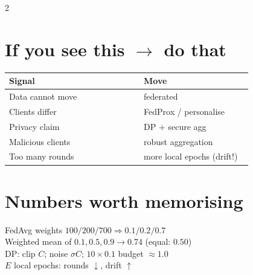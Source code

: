 \documentclass[11pt,a4paper]{article}
\newcommand{\sect}[1]{\section*{#1}}
\begin{document}
\begin{multicols}{2}
\sect{If you see this $\rightarrow$ do that}
\begin{tabular}{@{}p{0.52\linewidth}p{0.42\linewidth}@{}}
\toprule
Signal & Move\\
\midrule
Data cannot move & federated\\
Clients differ & FedProx / personalise\\
Privacy claim & DP + secure agg\\
Malicious clients & robust aggregation\\
Too many rounds & more local epochs (drift!)\\
\bottomrule
\end{tabular}


\sect{Numbers worth memorising}
FedAvg weights $100/200/700\Rightarrow0.1/0.2/0.7$\\
Weighted mean of $0.1,0.5,0.9\to0.74$ (equal: $0.50$)\\
DP: clip $C$; noise $\sigma C$; $10\times0.1$ budget $\approx1.0$\\
$E$ local epochs: rounds $\downarrow$, drift $\uparrow$

\end{multicols}
\end{document}
